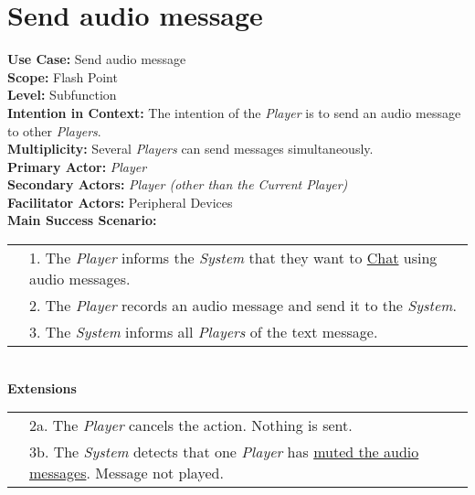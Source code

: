 \documentclass{article}
\begin{document}
	\section*{Send audio message}
	\textbf{Use Case:} Send audio message\\
	\textbf{Scope:} Flash Point\\
	\textbf{Level:} Subfunction\\
	\textbf{Intention in Context: } The intention of the \textit{Player} is to send an audio message to other \textit{Players}.\\
	\textbf{Multiplicity: } Several \textit{Players} can send messages simultaneously.\\
	\textbf{Primary Actor:} \textit{Player}\\
	\textbf{Secondary Actors:} \textit{Player (other than the Current Player)}\\
	\textbf{Facilitator Actors:} Peripheral Devices\\
	\textbf{Main Success Scenario:}\\
	\begin{tabular}{l l}
		&1. The \textit{Player} informs the \textit{System} that they want to \underline{Chat} using audio messages.\\
		&2. The \textit{Player} records an audio message and send it to the \textit{System}.\\
		&3. The \textit{System} informs all \textit{Players} of the text message.
	\end{tabular}\\
	\textbf{Extensions}\\
	\begin{tabular}{l l}
		&2a. The \textit{Player} cancels the action. Nothing is sent.\\
		&3b. The \textit{System} detects that one \textit{Player} has \underline{muted the audio messages}. Message not played.
	\end{tabular}
\end{document}
